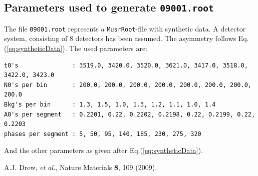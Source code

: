 \documentclass[twoside]{article}
\begin{document}
\subsection{Parameters used to generate \texttt{09001.root}}

The file \texttt{09001.root} represents a \texttt{MusrRoot}-file with synthetic data. A detector system, consisting of 8 detectors
has been assumed. The asymmetry follows Eq.(\ref{eq:syntheticData}). The used parameters are:

\small
\begin{verbatim}
t0's               : 3519.0, 3420.0, 3520.0, 3621.0, 3417.0, 3518.0, 3422.0, 3423.0
N0's per bin       : 200.0, 200.0, 200.0, 200.0, 200.0, 200.0, 200.0, 200.0
Bkg's per bin      : 1.3, 1.5, 1.0, 1.3, 1.2, 1.1, 1.0, 1.4
A0's per segment   : 0.2201, 0.22, 0.2202, 0.2198, 0.22, 0.2199, 0.22, 0.2203
phases per segment : 5, 50, 95, 140, 185, 230, 275, 320
\end{verbatim}
\normalsize

\noindent And the other parameters as given after Eq.(\ref{eq:syntheticData}).

\begin{thebibliography}{99}
  A.J. Drew, \emph{et al.}, Nature Materials \textbf{8}, 109
(2009). 
\end{thebibliography}
\end{document}
